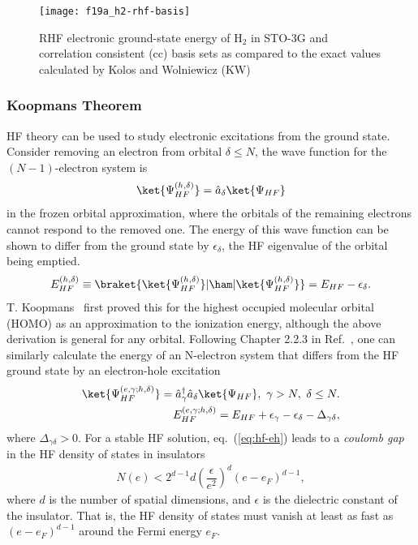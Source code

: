 \begin{figure}[h]
\centering
\texttt{[image: f19a\_h2-rhf-basis]}
\caption{RHF electronic ground-state energy of H$_2$ in STO-3G and correlation consistent (cc) basis sets as compared to the exact values calculated by Kolos and Wolniewicz (KW)~\cite{Kolos1964}}
\label{fig:hf-h2}
\end{figure}

\subsubsection{Koopmans Theorem}
HF theory can be used to study electronic excitations from the ground state. Consider removing an electron from orbital $\delta\le N$, the wave function for the $(N-1)$-electron system is~\cite{Giuliani2005}
\begin{align}
\ket{\Psi_{HF}^{(h,\delta)}} = \hat{a}_\delta\ket{\Psi_{HF}}
\end{align}
in the frozen orbital approximation, where the orbitals of the remaining electrons cannot respond to the removed one. The energy of this wave function can be shown to differ from the ground state by $\epsilon_\delta$, the HF eigenvalue of the orbital being emptied.
\begin{align}
E_{HF}^{(h,\delta)} \equiv \braket{\ket{\Psi_{HF}^{(h,\delta)}}|\ham|\ket{\Psi_{HF}^{(h,\delta)}}} = E_{HF} - \epsilon_\delta.
\end{align}
T. Koopmans~\cite{Koopmans1934} first proved this for the highest occupied molecular orbital (HOMO) as an approximation to the ionization energy, although the above derivation is general for any orbital.
Following Chapter 2.2.3 in Ref.~\cite{Giuliani2005}, one can similarly calculate the energy of an N-electron system that differs from the HF ground state by an electron-hole excitation
\begin{align}
\ket{\Psi_{HF}^{(e,\gamma;h,\delta)}} = \hat{a}_\gamma^\dagger \hat{a}_\delta \ket{\Psi_{HF}}, ~\gamma>N,~\delta\le N. \\
E_{HF}^{(e,\gamma;h,\delta)} = E_{HF}+\epsilon_\gamma-\epsilon_\delta-\Delta_{\gamma\delta},
\label{eq:hf-eh}
\end{align}
where $\Delta_{\gamma\delta}>0$. For a stable HF solution, eq.~(\ref{eq:hf-eh}) leads to a \textit{coulomb gap} in the HF density of states in insulators
\begin{align}
N(e) < 2^{d-1}d\left(\dfrac{\epsilon}{e^2}\right)^d(e-e_F)^{d-1},
\end{align}
where $d$ is the number of spatial dimensions, and $\epsilon$ is the dielectric constant of the insulator. That is, the HF density of states must vanish at least as fast as $(e-e_F)^{d-1}$ around the Fermi energy $e_F$.

